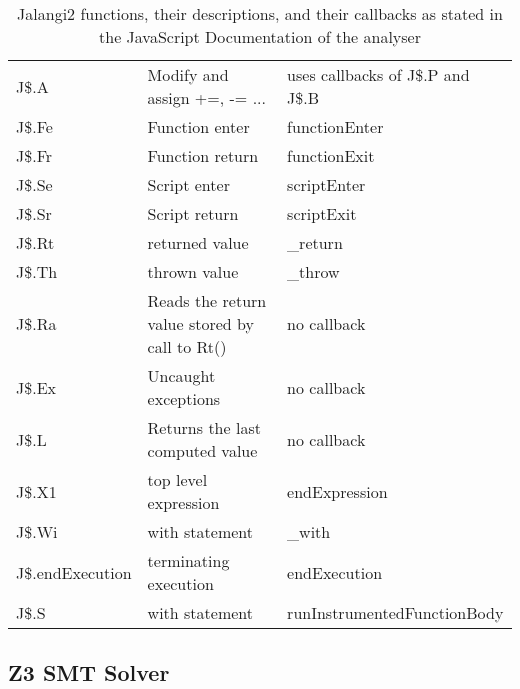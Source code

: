 \begin{table}[h]
{\begin{tabular}{l|l|l}
		J\$.A            & Modify and assign +=, -= ...                          & uses callbacks of J\$.P and J\$.B       \\
		J\$.Fe           & Function enter                                        & functionEnter                           \\
		J\$.Fr           & Function return                                       & functionExit                            \\
		J\$.Se           & Script enter                                          & scriptEnter                             \\
		J\$.Sr           & Script return                                         & scriptExit                              \\
		J\$.Rt           & returned value                                        & \_return                                \\
		J\$.Th           & thrown value                                          & \_throw                                 \\
		J\$.Ra           & Reads the return value stored by call to Rt()         & no callback                             \\
		J\$.Ex           & Uncaught exceptions                                   & no callback                             \\
		J\$.L            & Returns the last computed value                       & no callback                             \\
		J\$.X1           & top level expression                                  & endExpression                           \\
		J\$.Wi           & with statement                                        & \_with                                  \\
		J\$.endExecution & terminating execution                                 & endExecution                            \\
		J\$.S            & with statement                                        & runInstrumentedFunctionBody             \\
	\end{tabular}}
	\caption{Jalangi2  functions, their descriptions, and their callbacks as stated in the JavaScript Documentation of the analyser}
	\label{tab:jal-fun}
\end{table}

\FloatBarrier
\subsection{Z3 SMT Solver}
\label{sec:z3}


